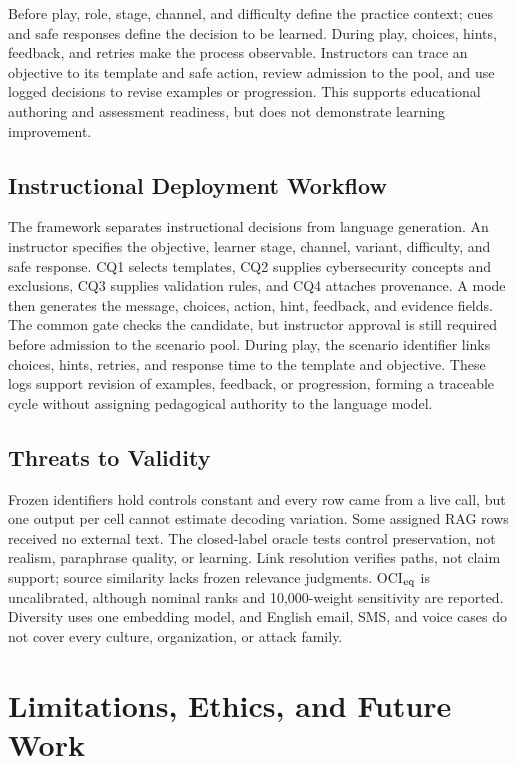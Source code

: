 \documentclass[runningheads]{llncs}
\begin{document}
Before play, role, stage, channel, and difficulty define the practice context;
cues and safe responses define the decision to be learned. During play, choices,
hints, feedback, and retries make the process observable. Instructors can trace an
objective to its template and safe action, review admission to the pool, and use
logged decisions to revise examples or progression. This supports educational
authoring and assessment readiness, but does not demonstrate learning improvement.

\subsection{Instructional Deployment Workflow}

The framework separates instructional decisions from language generation. An
instructor specifies the objective, learner stage, channel, variant, difficulty,
and safe response. CQ1 selects templates, CQ2 supplies cybersecurity concepts and
exclusions, CQ3 supplies validation rules, and CQ4 attaches provenance. A mode
then generates the message, choices, action, hint, feedback, and evidence fields.
The common gate checks the candidate, but instructor approval is still required
before admission to the scenario pool. During play, the scenario identifier links
choices, hints, retries, and response time to the template and objective. These
logs support revision of examples, feedback, or progression, forming a traceable
cycle without assigning pedagogical authority to the language model.

\subsection{Threats to Validity}

Frozen identifiers hold controls constant and every row came from a live call,
but one output per cell cannot estimate decoding variation. Some assigned RAG rows
received no external text. The closed-label oracle tests control preservation, not
realism, paraphrase quality, or learning. Link resolution verifies paths, not claim support; source similarity lacks frozen relevance
judgments. OCI$_{\rm eq}$ is uncalibrated, although nominal ranks and 10,000-weight sensitivity are reported. Diversity uses one embedding model, and English email, SMS, and voice
cases do not cover every culture, organization, or attack family.

\section{Limitations, Ethics, and Future Work}
\end{document}
